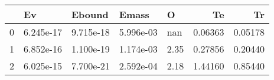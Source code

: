 \begin{tabular}{lllllrr}
\toprule
{} &         Ev &     Ebound &      Emass &     O &       Te &       Tr \\
\midrule
0 &  6.245e-17 &  9.715e-18 &  5.996e-03 &   nan &  0.06363 &  0.05178 \\
1 &  6.852e-16 &  1.100e-19 &  1.174e-03 &  2.35 &  0.27856 &  0.20440 \\
2 &  6.025e-15 &  7.700e-21 &  2.592e-04 &  2.18 &  1.44160 &  0.85440 \\
\bottomrule
\end{tabular}
